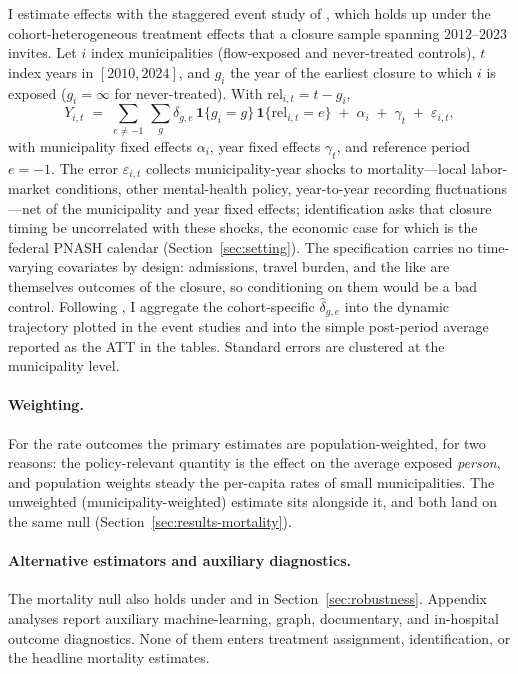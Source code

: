 I estimate effects with the staggered event study of
\citet{sunAbraham2021}, which holds up under the cohort-heterogeneous
treatment effects that a closure sample spanning $2012$--$2023$ invites.
Let $i$ index municipalities (flow-exposed and never-treated controls),
$t$ index years in $[2010, 2024]$, and $g_i$ the year of the earliest
closure to which $i$ is exposed ($g_i = \infty$ for never-treated). With
$\mathrm{rel}_{i,t} = t - g_i$,
\begin{equation}
  Y_{i, t} \;=\; \sum_{e \neq -1} \,
  \sum_{g} \delta_{g, e} \, \mathbf{1}\{g_i = g\} \,
  \mathbf{1}\{\mathrm{rel}_{i, t} = e\}
  \;+\; \alpha_i \;+\; \gamma_t \;+\; \varepsilon_{i, t},
  \label{eq:sa-estimating}
\end{equation}
with municipality fixed effects $\alpha_i$, year fixed effects
$\gamma_t$, and reference period $e = -1$. The error $\varepsilon_{i,t}$
collects municipality-year shocks to mortality---local labor-market
conditions, other mental-health policy, year-to-year recording
fluctuations---net of the municipality and year fixed effects;
identification asks that closure timing be uncorrelated with these
shocks, the economic case for which is the federal PNASH calendar
(Section~\ref{sec:setting}). The specification carries no time-varying
covariates by design: admissions, travel burden, and the like are
themselves outcomes of the closure, so conditioning on them would be a
bad control. Following \citet{sunAbraham2021}, I aggregate the
cohort-specific $\widehat{\delta}_{g,e}$ into the dynamic trajectory
plotted in the event studies and into the simple post-period average
reported as the ATT in the tables. Standard errors are clustered at the
municipality level.

\paragraph{Weighting.} For the rate outcomes the primary estimates are
population-weighted, for two reasons: the policy-relevant quantity is the
effect on the average exposed \emph{person}, and population weights steady
the per-capita rates of small municipalities. The unweighted
(municipality-weighted) estimate sits alongside it, and both land on the
same null (Section~\ref{sec:results-mortality}).

\paragraph{Alternative estimators and auxiliary diagnostics.} The
mortality null also holds under \citet{cs2021} and \citet{borusyak2024}
in Section~\ref{sec:robustness}. Appendix analyses report auxiliary
machine-learning, graph, documentary, and in-hospital outcome
diagnostics. None of them enters treatment assignment, identification, or
the headline mortality estimates.
